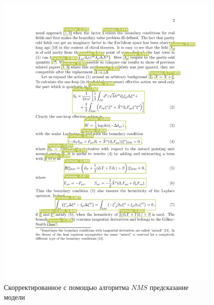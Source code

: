 \begin{figure}
    \includegraphics[scale=0.65]{img/train/nms.png}
    \caption{Скорректированное с помощью алгоритма $NMS$ предсказание модели}
    \label{nms_img}
\end{figure}